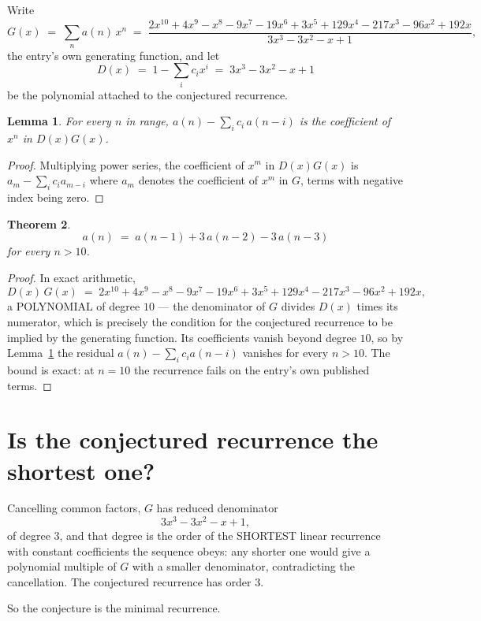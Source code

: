 \documentclass[11pt,a4paper]{article}
\theoremstyle{plain}
\newtheorem{theorem}{Theorem}
\newtheorem{lemma}[theorem]{Lemma}
\theoremstyle{definition}
\begin{document}
Write
\[
G(x)\;=\;\sum_{n}a(n)\,x^{n}\;=\;\frac{2 x^{10} + 4 x^{9} - x^{8} - 9 x^{7} - 19 x^{6} + 3 x^{5} + 129 x^{4} - 217 x^{3} - 96 x^{2} + 192 x}{3 x^{3} - 3 x^{2} - x + 1},
\]
the entry's own generating function, and let
\[
D(x)\;=\;1-\sum_i c_i x^{i}\;=\;3 x^{3} - 3 x^{2} - x + 1
\]
be the polynomial attached to the conjectured recurrence.

\begin{lemma}\label{lem:key}
For every $n$ in range, $a(n)-\sum_i c_i\,a(n-i)$ is the coefficient of $x^{n}$ in
$D(x)G(x)$.
\end{lemma}

\begin{proof}
Multiplying power series, the coefficient of $x^{m}$ in $D(x)G(x)$ is
$a_m-\sum_i c_i a_{m-i}$ where $a_m$ denotes the coefficient of $x^{m}$ in $G$, terms with
negative index being zero.
\end{proof}

\begin{theorem}
\[
a(n)\;=\;a(n-1) + 3\,a(n-2) - 3\,a(n-3)
\]
for every $n>10$.
\end{theorem}

\begin{proof}
In exact arithmetic,
\[
D(x)\,G(x)\;=\;2 x^{10} + 4 x^{9} - x^{8} - 9 x^{7} - 19 x^{6} + 3 x^{5} + 129 x^{4} - 217 x^{3} - 96 x^{2} + 192 x,
\]
a POLYNOMIAL of degree $10$ --- the denominator of $G$ divides $D(x)$ times its numerator,
which is precisely the condition for the conjectured recurrence to be implied by the
generating function. Its coefficients vanish beyond degree $10$, so by
Lemma~\ref{lem:key} the residual $a(n)-\sum_ic_ia(n-i)$ vanishes for every
$n>10$. The bound is exact: at $n=10$ the recurrence fails on the entry's own published terms.
\end{proof}

\section{Is the conjectured recurrence the shortest one?}

Cancelling common factors, $G$ has reduced denominator
\[
3 x^{3} - 3 x^{2} - x + 1,
\]
of degree $3$, and that degree is the order of the SHORTEST linear recurrence with
constant coefficients the sequence obeys: any shorter one would give a polynomial multiple of
$G$ with a smaller denominator, contradicting the cancellation. The conjectured recurrence has
order $3$.

So the conjecture is the minimal recurrence.
\end{document}
